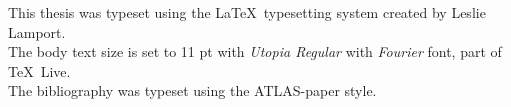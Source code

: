 \pagestyle{empty}
\hfill

\vfill

\begin{flushright}
	This thesis was typeset using the \LaTeX\ typesetting system created by Leslie Lamport.\\
	The body text size is set to 11 pt with \emph{Utopia Regular} with \emph{Fourier} font, part of \TeX\ Live.\\
	The bibliography was typeset using the \acs{ATLAS}-paper style.
\end{flushright}